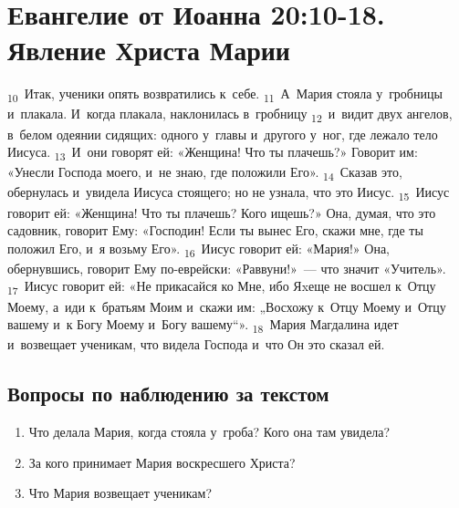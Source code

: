 \documentclass[a4paper,12pt]{article}
\begin{document}

\section{Евангелие от Иоанна 20:10-18. Явление Христа Марии}

\textsubscript{10}~Итак, ученики опять возвратились к~себе. \textsubscript{11}~А~Мария стояла у~гробницы и~плакала. И~когда плакала, наклонилась в~гробницу \textsubscript{12}~и~видит двух ангелов, в~белом одеянии сидящих: одного у~главы и~другого у~ног, где лежало тело Иисуса. \textsubscript{13}~И~они говорят ей: «Женщина! Что ты плачешь?» Говорит им: «Унесли Господа моего, и~не знаю, где положили Его». \textsubscript{14}~Сказав это, обернулась и~увидела Иисуса стоящего; но не узнала, что это Иисус. \textsubscript{15}~Иисус говорит ей: «Женщина! Что ты плачешь? Кого ищешь?» Она, думая, что это садовник, говорит Ему: «Господин! Если ты вынес Его, скажи мне, где ты положил Его, и~я возьму Его». \textsubscript{16}~Иисус говорит ей: «Мария!» Она, обернувшись, говорит Ему по-еврейски: «Раввуни!»~--- что значит «Учитель». \textsubscript{17}~Иисус говорит ей: «Не прикасайся ко Мне, ибо Яxеще не восшел к~Отцу Моему, а~иди к~братьям Моим и~скажи им: „Восхожу к~Отцу Моему и~Отцу вашему и~к Богу Моему и~Богу вашему“». \textsubscript{18}~Мария Магдалина идет и~возвещает ученикам, что видела Господа и~что Он это сказал ей. 

\subsection*{Вопросы по наблюдению за текстом}
\begin{enumerate}
    \item Что делала Мария, когда стояла у~гроба? Кого она там увидела? 
    
    \myline
    
    \myline
    \item За кого принимает Мария воскресшего Христа? 
    
    \myline
    
    \myline
    \item Что Мария возвещает ученикам? 
    
    \myline
    
    \myline
\end{enumerate}
\end{document}
